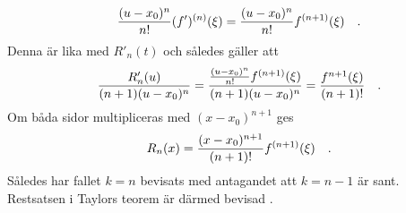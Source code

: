 \begin{equation}
    \frac{(u-x_0)^n}{n!}(f')^{(n)}(\xi)=\frac{(u-x_0)^n}{n!}f^{(n+1)}(\xi)
\quad\mathrm{.}\!\!\!\!\!\!\end{equation} Denna är lika med \(R'_n(t)\) och således gäller att
\begin{equation}
    \frac{R'_n(u)}{(n+1)(u-x_0)^n}=\frac{\frac{(u-x_0)^n}{n!}f^{(n+1)}(\xi)}{(n+1)(u-x_0)^n}=\frac{f^{n+1}(\xi)}{(n+1)!}
\quad\mathrm{.}\!\!\!\!\!\!\end{equation}
Om båda sidor multipliceras med \((x-x_0)^{n+1}\) ges
\begin{equation}
    R_n(x)=\frac{(x-x_0)^{n+1}}{(n+1)!}f^{(n+1)}(\xi)
\quad\mathrm{.}\!\!\!\!\!\!\end{equation} Således har fallet \(k=n\) bevisats med antagandet att \(k=n-1\) är sant. Restsatsen i Taylors teorem är därmed bevisad \parencite[274-275]{adams_calculus_2010}.
